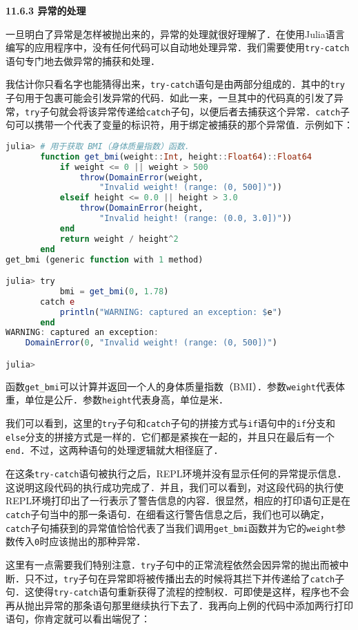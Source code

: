 \textbf{11.6.3 异常的处理}

一旦明白了异常是怎样被抛出来的，异常的处理就很好理解了．在使用Julia语言编写的应用程序中，没有任何代码可以自动地处理异常．我们需要使用\verb|try-catch|语句专门地去做异常的捕获和处理．

我估计你只看名字也能猜得出来，\verb|try-catch|语句是由两部分组成的．其中的\verb|try|子句用于包裹可能会引发异常的代码．如此一来，一旦其中的代码真的引发了异常，\verb|try|子句就会将该异常传递给\verb|catch|子句，以便后者去捕获这个异常．\verb|catch|子句可以携带一个代表了变量的标识符，用于绑定被捕获的那个异常值．示例如下：

\begin{lstlisting}[language=julia]
julia> # 用于获取 BMI（身体质量指数）函数．
       function get_bmi(weight::Int, height::Float64)::Float64
           if weight <= 0 || weight > 500
               throw(DomainError(weight, 
                   "Invalid weight! (range: (0, 500])"))
           elseif height <= 0.0 || height > 3.0
               throw(DomainError(height, 
                   "Invalid height! (range: (0.0, 3.0])"))
           end
           return weight / height^2
       end
get_bmi (generic function with 1 method)

julia> try 
           bmi = get_bmi(0, 1.78)
       catch e
           println("WARNING: captured an exception: $e")
       end
WARNING: captured an exception: 
    DomainError(0, "Invalid weight! (range: (0, 500])")

julia> 
\end{lstlisting}

函数\verb|get_bmi|可以计算并返回一个人的身体质量指数（BMI）．参数\verb|weight|代表体重，单位是公斤．参数\verb|height|代表身高，单位是米．

我们可以看到，这里的\verb|try|子句和\verb|catch|子句的拼接方式与\verb|if|语句中的\verb|if|分支和\verb|else|分支的拼接方式是一样的．它们都是紧挨在一起的，并且只在最后有一个\verb|end|．不过，这两种语句的处理逻辑就大相径庭了．

在这条\verb|try-catch|语句被执行之后，REPL环境并没有显示任何的异常提示信息．这说明这段代码的执行成功完成了．并且，我们可以看到，对这段代码的执行使REPL环境打印出了一行表示了警告信息的内容．很显然，相应的打印语句正是在\verb|catch|子句当中的那一条语句．在细看这行警告信息之后，我们也可以确定，\verb|catch|子句捕获到的异常值恰恰代表了当我们调用\verb|get_bmi|函数并为它的\verb|weight|参数传入\verb|0|时应该抛出的那种异常．

这里有一点需要我们特别注意．\verb|try|子句中的正常流程依然会因异常的抛出而被中断．只不过，\verb|try|子句在异常即将被传播出去的时候将其拦下并传递给了\verb|catch|子句．这使得\verb|try-catch|语句重新获得了流程的控制权．可即使是这样，程序也不会再从抛出异常的那条语句那里继续执行下去了．我再向上例的代码中添加两行打印语句，你肯定就可以看出端倪了：


